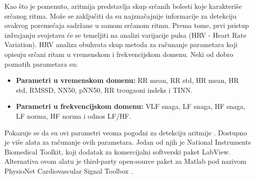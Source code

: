 \documentclass[12pt]{SeminarskiADS}
\begin{document}
Kao što je pomenuto, aritmija predstavlja skup srčanih bolesti koje karakteriše srčanog ritma. Može se zaključiti da su najznačajnije informacije za detekciju ovakvog poremećaja sadržane u samom srčanom ritmu. Prema tome, prvi pristup izdvajanju svojstava će se temeljiti na analizi varijacije pulsa (HRV - Heart Rate Variation). HRV analiza obuhvata skup metoda za računanje parametara koji opisuju srčani ritam u vremenskom i frekvencijskom domenu. Neki od dobro poznatih parametara su: 
\begin{itemize}
\item \textbf{Parametri u vremenskom domenu: } RR mean, RR std, HR mean, HR std, RMSSD, NN50, pNN50, RR trougaoni indeks i TINN.
\item \textbf{Parametri u frekvencijskom domenu: } VLF snaga, LF snaga, HF snaga, LF norma, HF norma i odnos LF/HF.
\end{itemize}
Pokazuje se da su ovi parametri veoma pogodni za detekciju aritmije \cite{gl}. Dostupno je više alata za računanje ovih parametara. Jedan od njih je National Instruments Biomedical Toolkit, koji dodatak za komercijalni softverski paket LabView. Alternativa ovom alatu je third-party open-source paket za Matlab pod nazivom PhysioNet Cardiovascular Signal Toolbox \cite{physionet_tbx}. 





\end{document}
